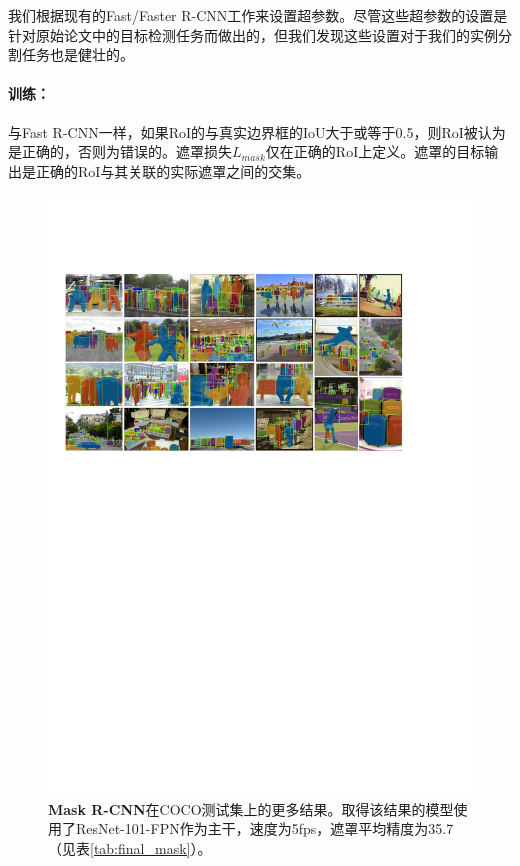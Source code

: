\label{sec:impl}

我们根据现有的Fast/Faster R-CNN工作来设置超参数。尽管这些超参数的设置是针对原始论文中的目标检测任务而做出的，但我们发现这些设置对于我们的实例分割任务也是健壮的。

\paragraph{训练：} 与Fast R-CNN一样，如果RoI的与真实边界框的IoU大于或等于0.5，则RoI被认为是正确的，否则为错误的。遮罩损失$L_{mask}$仅在正确的RoI上定义。遮罩的目标输出是正确的RoI与其关联的实际遮罩之间的交集。

\begin{figure}[t]
\centering
\includegraphics[width=1.0\linewidth]{figures/mask_rcnn/results_more}
\caption{\textbf{Mask R-CNN}在COCO测试集上的更多结果。取得该结果的模型使用了ResNet-101-FPN作为主干，速度为5fps，遮罩平均精度为35.7（见表\ref{tab:final_mask}）。}
\label{fig:results_more}
\end{figure}

